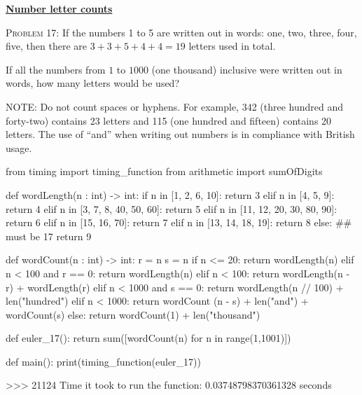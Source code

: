 \documentclass[11pt]{article}
\begin{document}
\par\bigskip\noindent
\href{https://projecteuler.net/problem=17}{\textbf{Number letter counts}}\par\noindent
\textsc{Problem 17:}
If the numbers 1 to 5 are written out in words: one, two, three, four, five, then there are $3 + 3 + 5 + 4 + 4 = 19$ letters used in total.
\par
If all the numbers from $1$ to $1000$ (one thousand) inclusive were written out in words, how many letters would be used?
\par
NOTE: Do not count spaces or hyphens. For example, 342 (three hundred and forty-two) contains 23 letters and 115 (one hundred and fifteen)
contains 20 letters. The use of ``and'' when writing out numbers is in compliance with British usage.
\begin{code}
from timing import timing_function
from arithmetic import sumOfDigits

def wordLength(n : int) -> int:
    if n in [1, 2, 6, 10]:
        return  3
    elif n in [4, 5, 9]:
        return 4
    elif n in [3, 7, 8, 40, 50, 60]:
        return 5
    elif n in [11, 12, 20, 30, 80, 90]:
        return 6
    elif n in  [15, 16, 70]:
        return 7
    elif n in [13, 14, 18, 19]:
        return 8
    else: ## must be 17
        return 9 

def wordCount(n : int) -> int:
    r = n %
    s = n %
    if n <= 20:
        return wordLength(n)
    elif n < 100 and r == 0:
        return wordLength(n)
    elif n < 100:
        return wordLength(n - r) + wordLength(r)
    elif n < 1000 and s == 0:
        return wordLength(n // 100) + len("hundred")
    elif n < 1000:
        return wordCount (n - s) + len("and") + wordCount(s)
    else:
        return wordCount(1) + len("thousand")
    
def euler_17():
    return sum([wordCount(n) for n in range(1,1001)])

def main():
    print(timing_function(euler_17))
\end{code}
\begin{shell}
>>> 
21124
Time it took to run the function: 0.03748798370361328 seconds
\end{shell}
\end{document}
